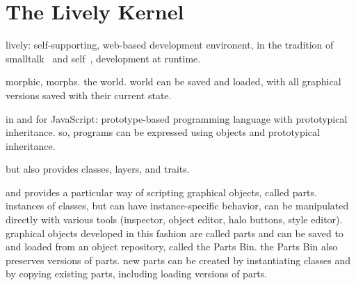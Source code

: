 \section{The Lively Kernel}

lively: self-supporting, web-based development environent, in the tradition of smalltalk~\cite{GoldbergRobson83} and self~\cite{Ungar1987SPS,Ungar2007SEL}, development at runtime.

morphic, morphs. the world. world can be saved and loaded, with all graphical versions saved with their current state.

in and for JavaScript: prototype-based programming language with prototypical inheritance.
so, programs can be expressed using objects and prototypical inheritance.

but also provides classes, layers, and traits. 

and provides a particular way of scripting graphical objects, called parts.
instances of classes, but can have instance-specific behavior, can be manipulated directly with various tools (inspector, object editor, halo buttons, style editor).
graphical objects developed in this fashion are called parts and can be saved to and loaded from an object repository, called the Parts Bin.
the Parts Bin also preserves versions of parts.
new parts can be created by instantiating classes and by copying existing parts, including loading versions of parts.






